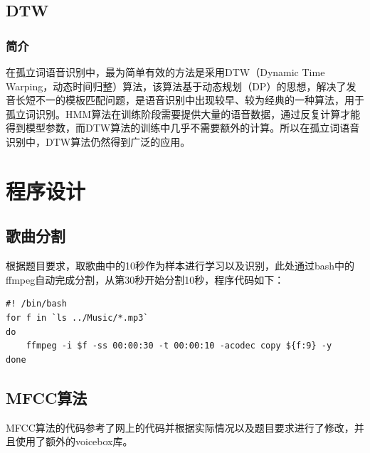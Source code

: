 \documentclass[11pt,a4paper,UTF8]{ctexart}
\begin{document}
	
	\subsection{DTW}
	\subsubsection{简介}
	在孤立词语音识别中，最为简单有效的方法是采用DTW（Dynamic Time Warping，动态时间归整）算法，该算法基于动态规划（DP）的思想，解决了发音长短不一的模板匹配问题，是语音识别中出现较早、较为经典的一种算法，用于孤立词识别。HMM算法在训练阶段需要提供大量的语音数据，通过反复计算才能得到模型参数，而DTW算法的训练中几乎不需要额外的计算。所以在孤立词语音识别中，DTW算法仍然得到广泛的应用。
	
	\section{程序设计}
	\subsection{歌曲分割}
	根据题目要求，取歌曲中的10秒作为样本进行学习以及识别，此处通过bash中的ffmpeg自动完成分割，从第30秒开始分割10秒，程序代码如下：
	\lstset{language=Bash}
\begin{lstlisting}
#! /bin/bash
for f in `ls ../Music/*.mp3`
do
    ffmpeg -i $f -ss 00:00:30 -t 00:00:10 -acodec copy ${f:9} -y
done
\end{lstlisting}
	\lstset{language=Matlab}
	\subsection{MFCC算法}
	MFCC算法的代码参考了网上的代码并根据实际情况以及题目要求进行了修改，并且使用了额外的voicebox库。
	
\end{document}
